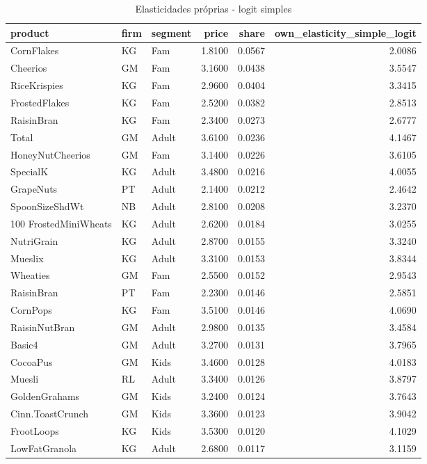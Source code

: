 \begin{table}[!htbp]
\centering
\caption{Elasticidades próprias - logit simples}
\label{tab:own-elas-simple}
\small
\begin{tabular}{lllrrr}
\toprule
product & firm & segment & price & share & own_elasticity_simple_logit \\
\midrule
CornFlakes & KG & Fam & 1.8100 & 0.0567 & 2.0086 \\
Cheerios & GM & Fam & 3.1600 & 0.0438 & 3.5547 \\
RiceKrispies & KG & Fam & 2.9600 & 0.0404 & 3.3415 \\
FrostedFlakes & KG & Fam & 2.5200 & 0.0382 & 2.8513 \\
RaisinBran & KG & Fam & 2.3400 & 0.0273 & 2.6777 \\
Total & GM & Adult & 3.6100 & 0.0236 & 4.1467 \\
HoneyNutCheerios & GM & Fam & 3.1400 & 0.0226 & 3.6105 \\
SpecialK & KG & Adult & 3.4800 & 0.0216 & 4.0055 \\
GrapeNuts & PT & Adult & 2.1400 & 0.0212 & 2.4642 \\
SpoonSizeShdWt & NB & Adult & 2.8100 & 0.0208 & 3.2370 \\
100%
FrostedMiniWheats & KG & Adult & 2.6200 & 0.0184 & 3.0255 \\
NutriGrain & KG & Adult & 2.8700 & 0.0155 & 3.3240 \\
Mueslix & KG & Adult & 3.3100 & 0.0153 & 3.8344 \\
Wheaties & GM & Fam & 2.5500 & 0.0152 & 2.9543 \\
RaisinBran & PT & Fam & 2.2300 & 0.0146 & 2.5851 \\
CornPops & KG & Fam & 3.5100 & 0.0146 & 4.0690 \\
RaisinNutBran & GM & Adult & 2.9800 & 0.0135 & 3.4584 \\
Basic4 & GM & Adult & 3.2700 & 0.0131 & 3.7965 \\
CocoaPus & GM & Kids & 3.4600 & 0.0128 & 4.0183 \\
Muesli & RL & Adult & 3.3400 & 0.0126 & 3.8797 \\
GoldenGrahams & GM & Kids & 3.2400 & 0.0124 & 3.7643 \\
Cinn.ToastCrunch & GM & Kids & 3.3600 & 0.0123 & 3.9042 \\
FrootLoops & KG & Kids & 3.5300 & 0.0120 & 4.1029 \\
LowFatGranola & KG & Adult & 2.6800 & 0.0117 & 3.1159 \\

\end{tabular}
\end{table}

